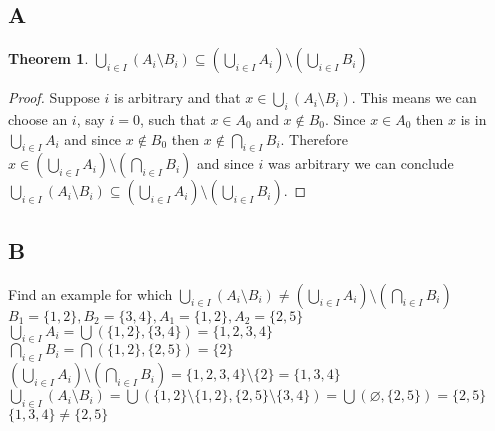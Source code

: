 \documentclass{article}
\newtheorem*{theorem}{Theorem}  %
\begin{document}
\subsection*{A}
\begin{theorem} $\bigcup_{i \in I} ( A_{i} \setminus B_{i} ) \subseteq ( \bigcup_{i \in I} A_{i} ) \setminus (\bigcup_{i \in I} B_{i})$
\end{theorem}
\begin{proof}
Suppose $i$ is arbitrary and that $x \in \bigcup_{i} (A_{i} \setminus B_{i})$. This means we can choose an $i$, say $i = 0$, such that $x \in A_{0}$ and $x \notin B_{0}$. Since $x \in A_{0}$ then $x$ is in $\bigcup_{i \in I} A_{i}$ and since $x \notin B_{0}$ then $x \notin \bigcap_{i \in I} B_{i}$. Therefore $x \in (\bigcup_{i \in I} A_{i}) \setminus (\bigcap_{i \in I} B_{i})$ and since $i$ was arbitrary we can conclude $\bigcup_{i \in I} ( A_{i} \setminus B_{i} ) \subseteq ( \bigcup_{i \in I} A_{i} ) \setminus (\bigcup_{i \in I} B_{i})$.
\end{proof}

\subsection*{B}
Find an example for which $\bigcup_{i \in I} (A_{i} \setminus B_{i} ) \neq (\bigcup_{i \in I} A_{i} ) \setminus (\bigcap_{i \in I} B_{i})$ \\

$B_{1} = \{1,2\}, B_{2} = \{3,4\}, A_{1} = \{1,2\}, A_{2} = \{2,5\}$ \\

$\bigcup_{i \in I} A_{i} = \bigcup(\{1,2\}, \{3,4\}) = \{1,2,3,4\}$ \\

$\bigcap_{i \in I} B_{i} = \bigcap(\{1,2\}, \{2,5\}) = \{2\}$ \\

$(\bigcup_{i \in I} A_{i}) \setminus (\bigcap_{i \in I} B_{i} ) = \{1,2,3,4\} \setminus \{2\} = \{1,3,4\}$ \\

$\bigcup_{i \in I} (A_{i} \setminus B_{i}) = \bigcup(\{1,2\} \setminus \{1,2\}, \{2,5\} \setminus \{3,4\}) = \bigcup ( \varnothing, \{2,5\}) = \{2, 5 \}$ \\

$\{1,3,4\} \neq \{2,5\}$
\end{document}
